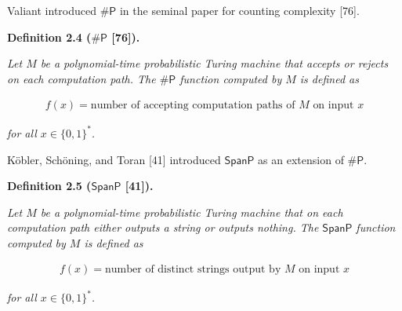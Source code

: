 Valiant introduced ${\mathsf{\#}\mathsf{P}}$ in the seminal paper for counting complexity [76].\par





\par\medskip\noindent\textbf{
\textbf{Definition 2.4}\textbf{ }(${\mathsf{\#}\mathsf{P}}$ [76])\textbf{.}
}\par



\emph{Let $M$ be a polynomial-time probabilistic Turing machine that accepts or rejects on each computation path. The ${\mathsf{\#}\mathsf{P}}$ function computed by $M$ is defined as}\par


\[\begin{gathered}
f(x)=\textrm{number of accepting computation paths of $M$ on input $x$}
\end{gathered}\]


\emph{for all $x\in\{0,1\}^{*}$.}\par






Köbler, Schöning, and Toran [41] introduced
$\mathsf{SpanP}$ as an extension of ${\mathsf{\#}\mathsf{P}}$.\par





\par\medskip\noindent\textbf{
\textbf{Definition 2.5}\textbf{ }($\mathsf{SpanP}$ [41])\textbf{.}
}\par



\emph{Let $M$ be a polynomial-time probabilistic
Turing machine that on each computation path either outputs a string
or outputs nothing. The $\mathsf{SpanP}$ function computed by $M$ is
defined as}\par


\[\begin{gathered}
f(x)=\textrm{number of distinct strings output by $M$ on
input $x$}
\end{gathered}\]


\emph{for all $x\in\{0,1\}^{*}$.}\par






